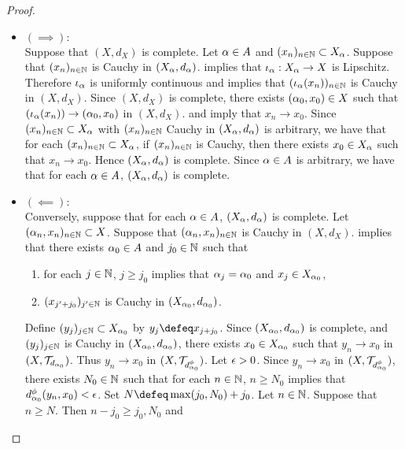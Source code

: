 \documentclass{book}
\begin{document}
\begin{proof}\
	\begin{itemize}
		\item $(\implies):$ \\
		Suppose that $(X, d_X)$ is complete. Let $\alpha \in A$ and $(x_n)_{n \in \mathbb{N}} \subset X_{\alpha}$. Suppose that $(x_n)_{n \in \mathbb{N}}$ is Cauchy in $(X_{\alpha}, d_{\alpha})$.  implies that $\iota_{\alpha}: X_{\alpha} \rightarrow X$ is Lipschitz. Therefore $\iota_{\alpha}$ is uniformly continuous and  implies that $(\iota_{\alpha}(x_n))_{n \in \mathbb{N}}$ is Cauchy in $(X, d_X)$. Since $(X, d_X)$ is complete, there exists $(\alpha_0, x_0) \in X$ such that $(\iota_{\alpha}(x_n)) \rightarrow (\alpha_0, x_0)$ in $(X, d_X)$.  and  imply that $x_n \rightarrow x_0$. Since $(x_n)_{n \in \mathbb{N}} \subset X_{\alpha}$ with $(x_n)_{n \in \mathbb{N}}$ Cauchy in $(X_{\alpha}, d_{\alpha})$ is arbitrary, we have that for each $(x_n)_{n \in \mathbb{N}} \subset X_{\alpha}$, if $(x_n)_{n \in \mathbb{N}}$ is Cauchy, then there exists $x_0 \in X_{\alpha}$ such that $x_n \rightarrow x_0$. Hence $(X_{\alpha}, d_{\alpha})$ is complete. Since $\alpha \in A$ is arbitrary, we have that for each $\alpha \in A$, $(X_{\alpha}, d_{\alpha})$ is complete.
		\item $(\impliedby):$ \\
		Conversely, suppose that for each $\alpha \in A$, $(X_{\alpha}, d_{\alpha})$ is complete. Let $(\alpha_n, x_n)_{n \in \mathbb{N}} \subset X$. Suppose that $(\alpha_n, x_n)_{n \in \mathbb{N}}$ is Cauchy in $(X, d_X)$.  implies that there exists $\alpha_0 \in A$ and $j_0 \in \mathbb{N}$ such that 
		\begin{enumerate}
			\item for each $j \in \mathbb{N}$, $j \geq j_0$ implies that $\alpha_j = \alpha_0$ and $x_j \in X_{\alpha_0}$,
			\item $(x_{j'+j_0})_{j' \in \mathbb{N}}$ is Cauchy in $(X_{\alpha_0}, d_{\alpha_0})$. 
		\end{enumerate}
		Define $(y_j)_{j \in \mathbb{N}} \subset X_{\alpha_0}$ by $y_j \defeq x_{j + j_0}$. Since $(X_{\alpha_0}, d_{\alpha_0})$ is complete, and $(y_j)_{j \in \mathbb{N}}$ is Cauchy in $(X_{\alpha_0}, d_{\alpha_0})$, there exists $x_0 \in X_{\alpha_0}$ such that $y_n \rightarrow x_0$ in $(X, \mathcal{T}_{d_{\alpha_0}})$. Thus $y_n \rightarrow x_0$ in $(X, \mathcal{T}_{d^{\phi}_{\alpha_0}})$. 
		Let $\epsilon > 0$. Since $y_n \rightarrow x_0$ in $(X, \mathcal{T}_{d^{\phi}_{\alpha_0}})$, there exists $N_0 \in \mathbb{N}$ such that for each $n \in \mathbb{N}$, $n \geq N_0$ implies that $d^{\phi}_{\alpha_0}(y_n, x_0) < \epsilon$. Set $N \defeq \max(j_0, N_0) + j_0$. Let $n \in \mathbb{N}$. Suppose that $n \geq N$. Then $n-j_0 \geq j_0, N_0$ and

\end{itemize}
\end{proof}
\end{document}
